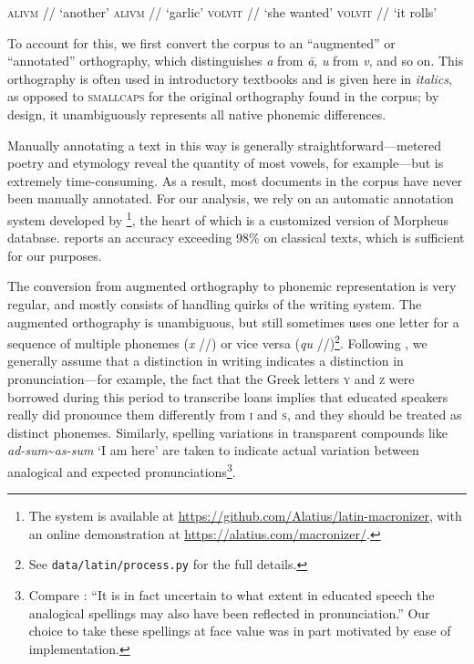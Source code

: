 \documentclass[12pt,twoside]{article}
\newcommand{\ipa}[1]{/\textipa{#1}/}
\begin{document}

\begin{exe}
\ex \textsc{alivm} \ipa{a.li.um} `another'
\ex \textsc{alivm} \ipa{a:.li.um} `garlic'
\ex \textsc{volvit} \ipa{wo.lu.it} `she wanted'
\ex \textsc{volvit} \ipa{wol.wit} `it rolls'
\end{exe}

To account for this, we first convert the corpus to an ``augmented'' or ``annotated'' orthography, which distinguishes \emph{a} from \emph{\=a}, \emph{u} from \emph{v}, and so on. This orthography is often used in introductory textbooks and is given here in \emph{italics}, as opposed to \textsc{smallcaps} for the original orthography found in the corpus; by design, it unambiguously represents all native phonemic differences.

Manually annotating a text in this way is generally straightforward---metered poetry and etymology reveal the quantity of most vowels, for example---but is extremely time-consuming. As a result, most documents in the corpus have never been manually annotated. For our analysis, we rely on an automatic annotation system developed by \citet{winge}\footnote{The system is available at \url{https://github.com/Alatius/latin-macronizer}, with an online demonstration at \url{https://alatius.com/macronizer/}.}, the heart of which is a customized version of  Morpheus database. \citet[27]{winge} reports an accuracy exceeding 98\% on classical texts, which is sufficient for our purposes.


The conversion from augmented orthography to phonemic representation is very regular, and mostly consists of handling quirks of the writing system. The augmented orthography is unambiguous, but still sometimes uses one letter for a sequence of multiple phonemes (\emph{x} \ipa{ks}) or vice versa (\emph{qu} \ipa{k\super{w}})\footnote{See \texttt{data/latin/process.py} for the full details.}. Following \citet{allen}, we generally assume that a distinction in writing indicates a distinction in pronunciation---for example, the fact that the Greek letters \textsc{y} and \textsc{z} were borrowed during this period to transcribe loans implies that educated speakers really did pronounce them differently from \textsc{i} and \textsc{s}, and they should be treated as distinct phonemes. Similarly, spelling variations in transparent compounds like \emph{ad-sum}\textasciitilde\emph{as-sum} `I am here' are taken to indicate actual variation between analogical and expected pronunciations\footnote{Compare \citet[22]{allen}: ``It is in fact uncertain to what extent in educated speech the analogical spellings may also have been reflected in pronunciation.'' Our choice to take these spellings at face value was in part motivated by ease of implementation.}.
\end{document}
